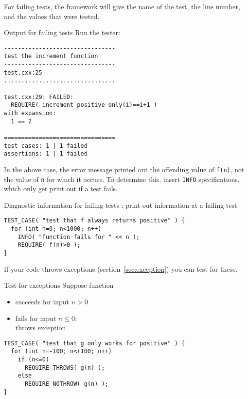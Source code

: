 For failing tests, the framework will give
the name of the test, the line number,
and the values that were tested.

\begin{block}{Output for failing tests}
  \label{sl:catch-fail}
  \small
  Run the tester:
\begin{verbatim}
--------------------------------
test the increment function
--------------------------------
test.cxx:25
................................

test.cxx:29: FAILED:
  REQUIRE( increment_positive_only(i)==i+1 )
with expansion:
  1 == 2

================================
test cases: 1 | 1 failed
assertions: 1 | 1 failed
\end{verbatim}
\end{block}

In the above case, the error message
printed out the offending value of \lstinline+f(n)+,
not the value of \lstinline+n+ for which it occurs.
To determine this, insert \lstinline+INFO+ specifications,
which only get print out if a test fails.

\begin{block}{Diagnostic information for failing tests}
  \label{sl:catch-info}
  : print out information at a failing test
\begin{lstlisting}
TEST_CASE( "test that f always returns positive" ) {
  for (int n=0; n<1000; n++)
    INFO( "function fails for " << n );
    REQUIRE( f(n)>0 );  
}  
\end{lstlisting}
\end{block}

If your code throws exceptions (section~\ref{sec:exception})
you can test for these.

\begin{block}{Test for exceptions}
  \label{sl:catch-case-throw}
Suppose function 
\begin{itemize}
\item succeeds for input $n>0$
\item fails for input $n\leq 0$:\\ throws exception
\end{itemize}

\begin{lstlisting}
TEST_CASE( "test that g only works for positive" ) {
  for (int n=-100; n<+100; n++)
    if (n<=0)
      REQUIRE_THROWS( g(n) );  
    else
      REQUIRE_NOTHROW( g(n) );  
}
\end{lstlisting}
\end{block}

